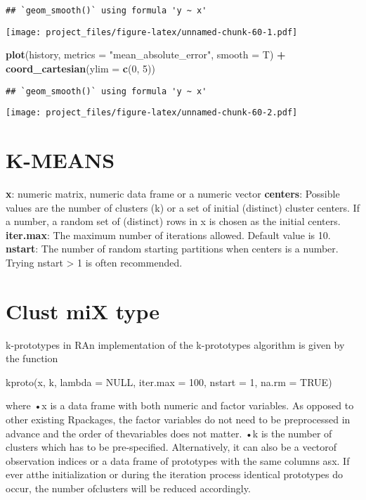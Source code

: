 \documentclass[
]{article}
\newenvironment{Shaded}{\begin{snugshade}}{\end{snugshade}}
\newcommand{\DataTypeTok}[1]{\textcolor[rgb]{0.13,0.29,0.53}{#1}}
\newcommand{\DecValTok}[1]{\textcolor[rgb]{0.00,0.00,0.81}{#1}}
\newcommand{\KeywordTok}[1]{\textcolor[rgb]{0.13,0.29,0.53}{\textbf{#1}}}
\newcommand{\NormalTok}[1]{#1}
\newcommand{\OperatorTok}[1]{\textcolor[rgb]{0.81,0.36,0.00}{\textbf{#1}}}
\newcommand{\StringTok}[1]{\textcolor[rgb]{0.31,0.60,0.02}{#1}}
\begin{document}
\begin{verbatim}
## `geom_smooth()` using formula 'y ~ x'
\end{verbatim}

\texttt{[image: project\_files/figure-latex/unnamed-chunk-60-1.pdf]}

\begin{Shaded}
\begin{Highlighting}[]
\KeywordTok{plot}\NormalTok{(history, }\DataTypeTok{metrics =} \StringTok{"mean_absolute_error"}\NormalTok{, }\DataTypeTok{smooth =}\NormalTok{ T) }\OperatorTok{+}
\StringTok{  }\KeywordTok{coord_cartesian}\NormalTok{(}\DataTypeTok{ylim =} \KeywordTok{c}\NormalTok{(}\DecValTok{0}\NormalTok{, }\DecValTok{5}\NormalTok{))}
\end{Highlighting}
\end{Shaded}

\begin{verbatim}
## `geom_smooth()` using formula 'y ~ x'
\end{verbatim}

\texttt{[image: project\_files/figure-latex/unnamed-chunk-60-2.pdf]}

\hypertarget{k-means}{%
\section{K-MEANS}\label{k-means}}

\textbf{x}: numeric matrix, numeric data frame or a numeric vector
\textbf{centers}: Possible values are the number of clusters (k) or a
set of initial (distinct) cluster centers. If a number, a random set of
(distinct) rows in x is chosen as the initial centers.
\textbf{iter.max}: The maximum number of iterations allowed. Default
value is 10. \textbf{nstart}: The number of random starting partitions
when centers is a number. Trying nstart \textgreater{} 1 is often
recommended.

\hypertarget{clust-mix-type}{%
\section{Clust miX type}\label{clust-mix-type}}

k-prototypes in RAn implementation of the k-prototypes algorithm is
given by the function

kproto(x, k, lambda = NULL, iter.max = 100, nstart = 1, na.rm = TRUE)

where •x is a data frame with both numeric and factor variables. As
opposed to other existing Rpackages, the factor variables do not need to
be preprocessed in advance and the order of thevariables does not
matter. •k is the number of clusters which has to be pre-specified.
Alternatively, it can also be a vectorof observation indices or a data
frame of prototypes with the same columns asx. If ever atthe
initialization or during the iteration process identical prototypes do
occur, the number ofclusters will be reduced accordingly.
\end{document}
